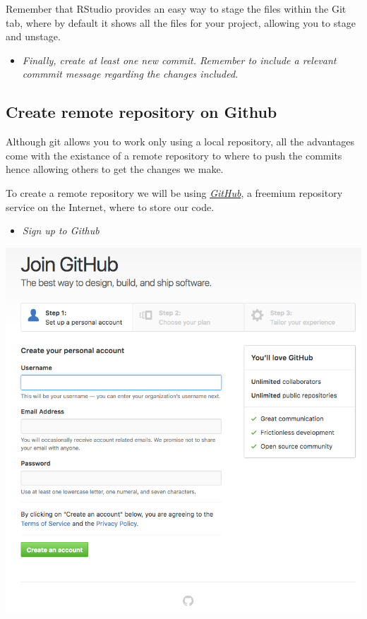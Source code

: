 \documentclass[]{article}
\providecommand{\tightlist}{%
  \setlength{\itemsep}{0pt}\setlength{\parskip}{0pt}}
\begin{document}
Remember that RStudio provides an easy way to stage the files within the
Git tab, where by default it shows all the files for your project,
allowing you to stage and unstage.

\begin{itemize}
\tightlist
\item
  \emph{Finally, create at least one new commit. Remember to include a
  relevant commmit message regarding the changes included.}
\end{itemize}

\subsection{Create remote repository on
Github}\label{create-remote-repository-on-github}

Although git allows you to work only using a local repository, all the
advantages come with the existance of a remote repository to where to
push the commits hence allowing others to get the changes we make.

To create a remote repository we will be using
\emph{\href{https://github.com/}{GitHub}}, a freemium repository service
on the Internet, where to store our code.

\begin{itemize}
\tightlist
\item
  \emph{Sign up to Github}
\end{itemize}

\begin{center}\includegraphics[width=600px]{figures/sign_up_github} \end{center}
\end{document}
